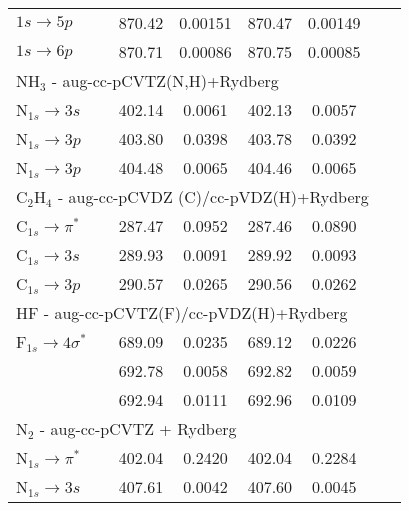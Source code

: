 \documentclass[journal=jctcce,manuscript=article]{achemso}
\begin{document}
\begin{table}[hb!]
\begin{tabular}{lc|cc|cc|cc}
${1s} \to 5p $  &&  870.42 & 0.00151 & 870.47  &   0.00149& & \\
${1s} \to 6p $  &&  870.71 & 0.00086 & 870.75  &   0.00085& & \\
\hline
\multicolumn{8}{l}{NH$_3$ - aug-cc-pCVTZ(N,H)+Rydberg}\\
\hline
N$_{1s} \to 3s $  && 402.14   & 0.0061 & 402.13 & 0.0057 & & \\
N$_{1s} \to 3p $  && 403.80   & 0.0398 & 403.78 & 0.0392 & & \\
N$_{1s} \to 3p $  && 404.48   & 0.0065 & 404.46 & 0.0065 & & \\ 
\hline
\multicolumn{8}{l}{C$_2$H$_4$ - aug-cc-pCVDZ (C)/cc-pVDZ(H)+Rydberg}\\
\hline
C$_{1s} \to \pi^* $&& 287.47   & 0.0952  & 287.46 & 0.0890  & & \\
C$_{1s} \to 3s   $  && 289.93   & 0.0091  & 289.92 & 0.0093  & & \\
C$_{1s} \to 3p   $ && 290.57   & 0.0265  & 290.56 & 0.0262 & & \\
\hline
\multicolumn{8}{l}{HF - aug-cc-pCVTZ(F)/cc-pVDZ(H)+Rydberg}\\\hline
F$_{1s}\to 4\sigma^*$ && 689.09 & 0.0235 & 689.12 & 0.0226& &  \\
     && 692.78 & 0.0058 & 692.82 & 0.0059 & & \\
     && 692.94 & 0.0111 & 692.96 & 0.0109 & & \\
\hline
\multicolumn{8}{l}{N$_2$ - aug-cc-pCVTZ + Rydberg}\\
\hline
N$_{1s}\to \pi^*$ && 402.04 & 0.2420 & 402.04 & 0.2284 & & \\
N$_{1s}\to 3s$ && 407.61 & 0.0042 & 407.60 & 0.0045 & & \\
 \hline
\end{tabular}
\end{table}

 
  
\end{document}
